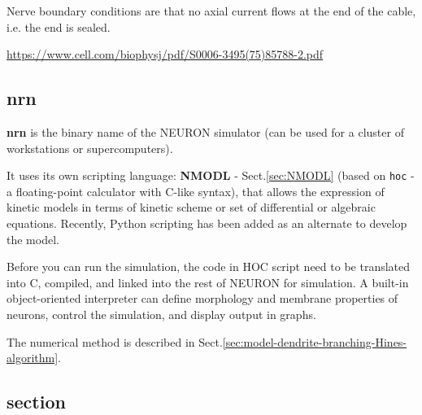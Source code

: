 Nerve boundary conditions are that no axial current flows at the end of the
cable, i.e. the end is sealed. 

\url{https://www.cell.com/biophysj/pdf/S0006-3495(75)85788-2.pdf}

\subsection{nrn}
\label{sec:nrn-NEURON}

{\bf nrn} is the binary name of the NEURON simulator (can be used for a cluster
of workstations or supercomputers). 

It uses its own scripting language: {\bf NMODL} - Sect.\ref{sec:NMODL} (based on
\verb!hoc! - a floating-point calculator with C-like syntax), that allows the
expression of kinetic models in terms of kinetic scheme or set of differential
or algebraic equations. Recently, Python scripting has been added as an
alternate to develop the model.

Before you can run the simulation, the code in HOC script need to be translated
into C, compiled, and linked into the rest of NEURON for simulation. A built-in
object-oriented interpreter can define morphology and membrane properties of
neurons, control the simulation, and display output in graphs.

The numerical method is described in
Sect.\ref{sec:model-dendrite-branching-Hines-algorithm}.

\subsection{section}
\label{sec:NEURON-section}
\label{sec:section-NEURON}

